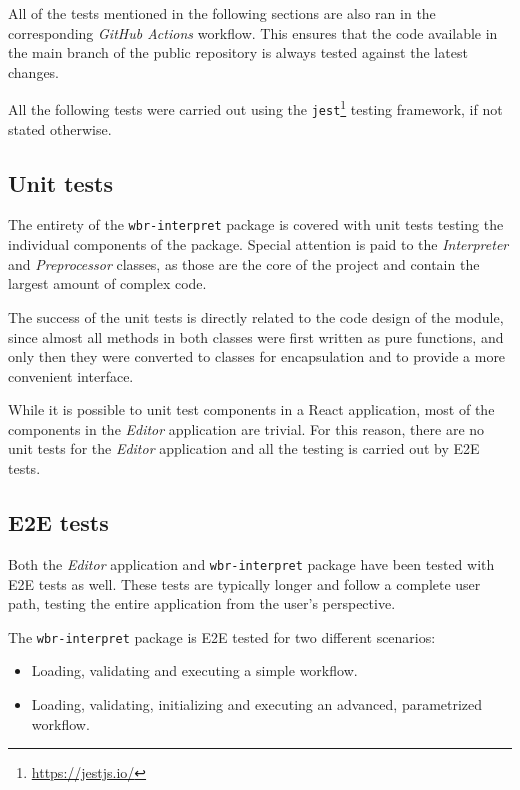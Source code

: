 All of the tests mentioned in the following sections are also ran in the corresponding \textit{GitHub Actions} workflow. 
This ensures that the code available in the main branch of the public repository is always tested against the latest changes.

All the following tests were carried out using the \texttt{jest}\footnote{\href{https://jestjs.io/}{https://jestjs.io/}} testing framework, if not stated otherwise.

\subsection{Unit tests}

The entirety of the \texttt{wbr-interpret} package is covered with unit tests testing the individual components of the package.
Special attention is paid to the \textit{Interpreter} and \textit{Preprocessor} classes, as those are the core of the project
and contain the largest amount of complex code. 

The success of the unit tests is directly related to the code design of the module, 
since almost all methods in both classes were first written as pure functions, and only then they were converted to classes for
encapsulation and to provide a more convenient interface.

\smallskip
While it is possible to unit test components in a React application, most of the components in the \textit{Editor} application are trivial.
For this reason, there are no unit tests for the \textit{Editor} application and all the testing is carried out by \ac{E2E} tests.

\subsection{E2E tests}

Both the \textit{Editor} application and \texttt{wbr-interpret} package have been tested with \acl{E2E} tests as well.
These tests are typically longer and follow a complete user path, testing the entire application from the user's perspective.

The \texttt{wbr-interpret} package is \acl{E2E} tested for two different scenarios:
\begin{itemize}
    \item Loading, validating and executing a simple workflow.
    \item Loading, validating, initializing and executing an advanced, parametrized workflow.
\end{itemize}

